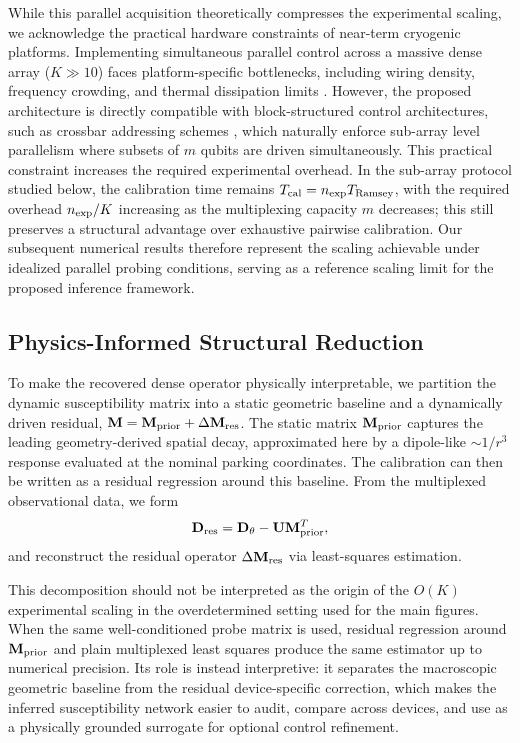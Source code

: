 \documentclass[a4paper,twocolumn,11pt]{quantumarticle}
\begin{document}
While this parallel acquisition theoretically compresses the experimental scaling, we acknowledge the practical hardware constraints of near-term cryogenic platforms. Implementing simultaneous parallel control across a massive dense array ($K \gg 10$) faces platform-specific bottlenecks, including wiring density, frequency crowding, and thermal dissipation limits \cite{vandersypen_interfacing_2017, gonzalez-zalba_scaling_2021, bartee_spin-qubit_2025}. However, the proposed architecture is directly compatible with block-structured control architectures, such as crossbar addressing schemes \cite{veldhorst_silicon_2017, li_crossbar_2018}, which naturally enforce sub-array level parallelism where subsets of $m$ qubits are driven simultaneously. This practical constraint increases the required experimental overhead. In the sub-array protocol studied below, the calibration time remains $T_{\rm cal}=n_{\rm exp}T_{\rm Ramsey}$, with the required overhead $n_{\rm exp}/K$ increasing as the multiplexing capacity $m$ decreases; this still preserves a structural advantage over exhaustive pairwise calibration. Our subsequent numerical results therefore represent the scaling achievable under idealized parallel probing conditions, serving as a reference scaling limit for the proposed inference framework.

\subsection{Physics-Informed Structural Reduction}
\label{sec:physics_inference}

To make the recovered dense operator physically interpretable, we partition the dynamic susceptibility matrix into a static geometric baseline and a dynamically driven residual, $\mathbf{M} = \mathbf M_{\rm prior} + \Delta\mathbf M_{\rm res}$. The static matrix $\mathbf M_{\rm prior}$ captures the leading geometry-derived spatial decay, approximated here by a dipole-like $\sim 1/r^3$ response evaluated at the nominal parking coordinates. The calibration can then be written as a residual regression around this baseline. From the multiplexed observational data, we form
\begin{equation}
    \mathbf{D}_{\rm res} = \mathbf{D}_{\theta} - \mathbf U\mathbf M_{\rm prior}^{T},
\end{equation}
and reconstruct the residual operator $\Delta\mathbf M_{\rm res}$ via least-squares estimation. 

This decomposition should not be interpreted as the origin of the $O(K)$ experimental scaling in the overdetermined setting used for the main figures. When the same well-conditioned probe matrix is used, residual regression around $\mathbf M_{\rm prior}$ and plain multiplexed least squares produce the same estimator up to numerical precision. Its role is instead interpretive: it separates the macroscopic geometric baseline from the residual device-specific correction, which makes the inferred susceptibility network easier to audit, compare across devices, and use as a physically grounded surrogate for optional control refinement.
\end{document}
